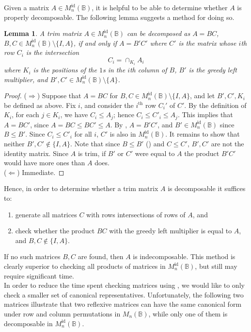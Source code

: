 \documentclass[11pt]{article}
\newtheorem{lemma}[thm]{Lemma}
\numberwithin{equation}{section}
\newcommand{\B}{\mathbb{B}}
\newcommand{\Bn}{M_n(\B)}
\newcommand{\Refn}{M_n^{\text{id}}(\B)}
\begin{document}
Given a matrix $A \in \Refn$, it is helpful to be able to determine whether $A$
is properly decomposable. The following lemma suggests a method for doing so.

\begin{lemma}
  A trim matrix $A \in \Refn$ can be decomposed as $A = BC$, $B, C \in
  \Refn\setminus\{I, A\}$, if and only if $A = B'C'$ where $C'$ is the matrix
  whose $i$th row $C_i$ is the intersection 
  \[ C_i = \cap_{K_i} A_i \]
  where $K_i$ is the positions of the $1$s in the $i$th column of $B$, $B'$ is
  the greedy left multiplier, and $B', C' \in \Refn \setminus\{A\}$.
\end{lemma}
\begin{proof}
  ($\Rightarrow$)
  Suppose that $A = BC$ for $B, C \in \Refn \setminus\{I, A\}$, and let $B', C',
  K_i$ be defined as above. Fix $i$, and consider the $i^{\text{th}}$ row $C_i'$
  of $C'$. By the definition of $K_i$, for each $j \in K_i$, we have $C_i \leq
  A_j$; hence $C_i \leq C'_i \leq A_j$. This implies that $A = BC'$, since $A =
  BC \leq BC' \leq A$. By , $A = B'C'$, and $B' \in
  \Refn$ since $B \leq B'$. Since $C_i \leq C'_i$ for all $i$, $C'$ is also in
  $\Refn$. It remains to show that neither $B', C' \not\in \{I, A\}$. Note
  that since $B \leq B'$ () and $C \leq C'$, $B', C'$
  are not the identity matrix. Since $A$ is trim, if $B'$ or $C'$ were equal
  to $A$ the product $B'C'$ would have more ones than $A$ does.\\
  ($\Leftarrow$) Immediate.
\end{proof}
Hence, in order to determine whether a trim matrix $A$ is decomposable it
suffices to:
\begin{enumerate}
  \item generate all matrices $C$ with rows intersections of rows of $A$, and
  \item check whether the product $BC$ with the greedy left multiplier is equal
    to $A$, and $B, C \not\in \{I, A\}$.
\end{enumerate}
If no such matrices $B, C$ are found, then $A$ is indecomposable. This method is
clearly superior to checking all products of matrices in $\Refn$, but still may
require significant time.\\

In order to reduce the time spent checking matrices using
, we would like to only check a smaller set of
canonical representatives. Unfortunately, the following two matrices illustrate
that two reflexive matrices can have the same canonical form under row and
column permutations in $\Bn$, while only one of them is decomposable in $\Refn$. 
\end{document}
